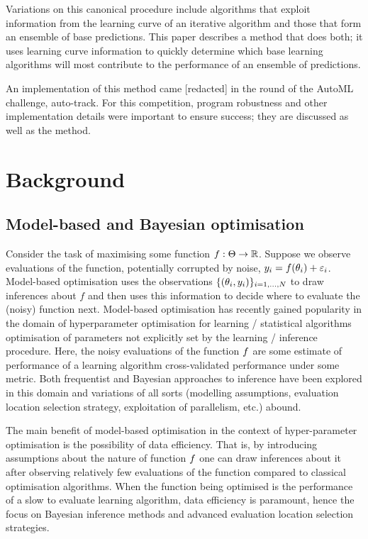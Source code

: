 \documentclass{article} %
\begin{document}
Variations on this canonical procedure include algorithms that exploit information from the learning curve of an iterative algorithm and those that form an ensemble\footnotemark{} of base predictions.
This paper describes a method that does both; it uses learning curve information to quickly determine which base learning algorithms will most contribute to the performance of an ensemble of predictions.


An implementation of this method came [redacted] in the  round of the AutoML challenge, auto-track.
For this competition, program robustness and other implementation details were important to ensure success; they are discussed as well as the method.

\section{Background}

\subsection{Model-based and Bayesian optimisation}

Consider the task of maximising some function ${f : \Theta \to \mathbb{R}}$.
Suppose we observe evaluations of the function, potentially corrupted by noise, ${y_i = f(\theta_i) + \varepsilon_i}$.
Model-based optimisation uses the observations ${\{(\theta_i, y_i)\}_{i=1,\dots,N}}$ to draw inferences about $f$ and then uses this information to decide where to evaluate the (noisy) function next.
Model-based optimisation has recently gained popularity in the domain of hyperparameter optimisation for learning / statistical algorithms \ie optimisation of parameters not explicitly set by the learning / inference procedure.
Here, the noisy evaluations of the function $f$ are some estimate of performance of a learning algorithm \eg cross-validated performance under some metric.
Both frequentist and Bayesian approaches to inference have been explored in this domain and variations of all sorts (modelling assumptions, evaluation location selection strategy, exploitation of parallelism, etc.) abound.

The main benefit of model-based optimisation in the context of hyper-parameter optimisation is the possibility of data efficiency.
That is, by introducing assumptions about the nature of function $f$ one can draw inferences about it after observing relatively few evaluations of the function compared to classical optimisation algorithms\footnotemark{}.
When the function being optimised is the performance of a slow to evaluate learning algorithm, data efficiency is paramount, hence the focus on Bayesian inference methods and advanced evaluation location selection strategies.
\end{document}
